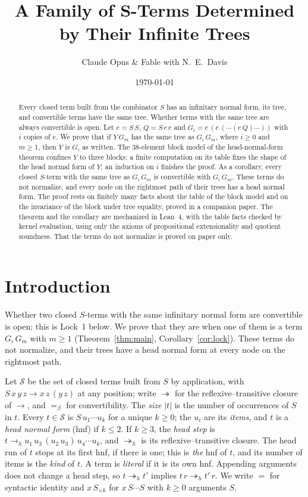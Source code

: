 \documentclass[11pt]{amsart}
\title[Determined by Their Trees]{A Family of $\bm{S}$-Terms Determined by Their Infinite Trees}
\author{Claude Opus \& Fable with N.\ E.\ Davis}
\date{\today}
\theoremstyle{definition}
\newcommand{\Ter}{\mathcal S}
\newcommand{\red}{\twoheadrightarrow}
\newcommand{\hred}{\twoheadrightarrow_h}
\newcommand{\hstep}{\to_h}
\newcommand{\conv}{=_\beta}
\newcommand{\sz}[1]{\lvert#1\rvert}
\newcommand{\Sk}[1]{S_{\times#1}}
\begin{document}
\begin{abstract}
Every closed term built from the combinator $S$ has an infinitary normal form, its tree, and
convertible terms have the same tree. Whether terms with the same tree are always convertible is
open. Let $e=S\,S$, $Q=S\,e\,e$ and $G_i=e\,(e\,(\cdots(e\,Q)\cdots))$ with $i$ copies of $e$. We
prove that if $Y\,G_m$ has the same tree as $G_i\,G_m$, where $i\ge0$ and $m\ge1$, then $Y$ is
$G_i$ as written. The 38-element block model of the head-normal-form theorem confines $Y$ to three
blocks; a finite computation on its table fixes the shape of the head normal form of $Y$; an
induction on $i$ finishes the proof. As a corollary, every closed $S$-term with the same tree as
$G_i\,G_m$ is convertible with $G_i\,G_m$. These terms do not normalize, and every node on the
rightmost path of their trees has a head normal form. The proof rests on finitely many facts about
the table of the block model and on the invariance of the block under tree equality, proved in a
companion paper. The theorem and the corollary are mechanized in Lean~4, with the table facts
checked by kernel evaluation, using only the axioms of propositional extensionality and quotient
soundness. That the terms do not normalize is proved on paper only.
\end{abstract}

\maketitle

\section{Introduction}

Whether two closed $S$-terms with the same infinitary normal form are convertible is open; this is
Lock~1 below. We prove that they are when one of them is a term $G_i\,G_m$ with $m\ge1$
(Theorem~\ref{thm:main}, Corollary~\ref{cor:lock}). These terms do not normalize, and their trees
have a head normal form at every node on the rightmost path.

Let $\Ter$ be the set of closed terms built from $S$ by application, with
$S\,x\,y\,z\to x\,z\,(y\,z)$ at any position; write $\red$ for the reflexive--transitive closure of
$\to$, and $\conv$ for convertibility. The \emph{size} $\sz t$ is the number of occurrences of $S$
in $t$. Every $t\in\Ter$ is $S\,u_1\cdots u_k$ for a unique $k\ge0$; the $u_i$ are its
\emph{items}, and $t$ is a \emph{head normal form} (hnf) if $k\le2$. If $k\ge3$, the \emph{head
step} is $t\hstep u_1\,u_3\,(u_2\,u_3)\,u_4\cdots u_k$, and $\hred$ is its reflexive--transitive
closure. The head run of $t$ stops at its first hnf, if there is one; this is \emph{the} hnf of
$t$, and its number of items is the \emph{kind} of $t$. A term is \emph{literal} if it is its own
hnf. Appending arguments does not change a head step, so $t\hred t'$ implies $t\,r\hred t'\,r$. We
write $=$ for syntactic identity and $x\,\Sk k$ for $x\,S\cdots S$ with $k\ge0$ arguments $S$.
\end{document}
